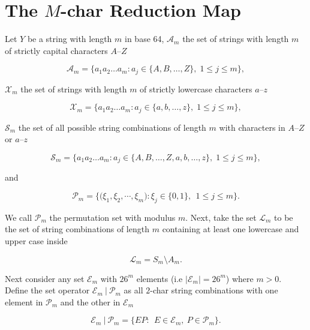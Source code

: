 \documentclass[amsmath,12pt,a4paper]{amsart}
\begin{document}
\section{The $M$-char Reduction Map} 
Let $Y$ be a string with length $m$ in base 64, $\mathcal{A}_m$ the set of strings with length $m$ of strictly capital characters $A$--$Z$

\begin{equation}\label{Eq1}
\mathcal{A}_m = \{a_1a_2\ldots a_m : a_j \in \{A, B, \ldots, Z\}, \; 1 \leq j \leq m\},
\end{equation}

$\mathcal{X}_m$ the set of strings with length $m$ of strictly lowercase characters $a$--$z$

\begin{equation}\label{Eq2}
\mathcal{X}_m = \{a_1a_2\ldots a_m : a_j \in \{a, b, \ldots, z\}, \; 1 \leq j \leq m\},
\end{equation}

$\mathcal{S}_m$ the set of all possible string combinations of length $m$ with characters in $A$--$Z$ or $a$--$z$\

\begin{equation}\label{Eq3}
\mathcal{S}_m = \{a_1a_2\ldots a_m : a_j \in \{A, B, \ldots, Z, a, b, \ldots, z\}, \; 1 \leq j \leq m\},
\end{equation}

and 

\begin{equation}\label{Eq4}
\mathcal{P}_m = \{\biggl(\xi_1,\xi_2,\cdots, \xi_m\biggr) : \xi_j \in \{0,1\}, ~~1\le j\le m\}.
\end{equation}


We call $\mathcal{P}_m$ the permutation set with modulus $m$. Next, take the set $\mathcal{L}_m$ to be the set of string combinations of length $m$ containing at least one lowercase and upper case inside 

\begin{equation}\label{Eq5}
\mathcal{L}_m = S_m \setminus A_m.
\end{equation}


Next consider any set $\mathcal{E}_m$ with $26^m$ elements (i.e $|\mathcal{E}_m| = 26^m$) where $m>0$. Define the set operator $\mathcal{E}_m ~ \vert ~\mathcal{P}_m$ as all $2$-char string combinations with one element in $\mathcal{P}_m$ and the other in $\mathcal{E}_m$ 

\begin{equation}\label{Eq6}
\mathcal{E}_m ~ \vert ~\mathcal{P}_m = \biggl\{EP:~~ E\in \mathcal{E}_m, ~P\in \mathcal{P}_m\biggr\}.
\end{equation}
\end{document}
